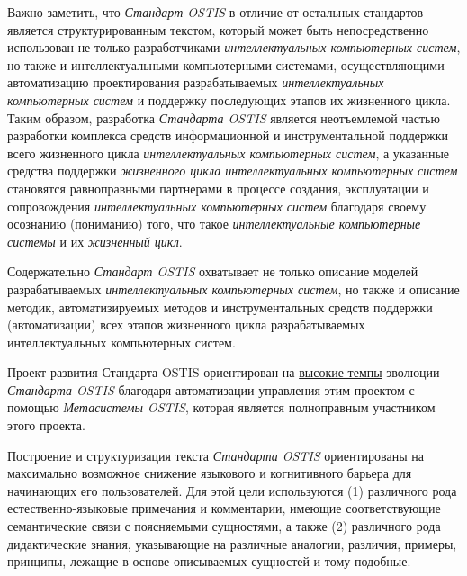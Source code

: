 Важно заметить, что \textit{Стандарт OSTIS} в отличие от остальных стандартов является структурированным  текстом, который может быть непосредственно использован не только разработчиками \textit{интеллектуальных компьютерных систем}, но также и интеллектуальными компьютерными системами, осуществляющими автоматизацию проектирования разрабатываемых \textit{интеллектуальных компьютерных систем} и поддержку последующих этапов их жизненного цикла. Таким образом, разработка \textit{Стандарта OSTIS} является неотъемлемой частью разработки комплекса средств информационной и инструментальной поддержки всего жизненного цикла \textit{интеллектуальных компьютерных систем}, а указанные средства поддержки \textit{жизненного цикла интеллектуальных компьютерных систем} становятся равноправными партнерами в процессе создания, эксплуатации и сопровождения \textit{интеллектуальных компьютерных систем} благодаря своему осознанию (пониманию) того, что такое \textit{интеллектуальные компьютерные системы} и их \textit{жизненный цикл}.

Содержательно \textit{Стандарт OSTIS} охватывает не только описание моделей разрабатываемых \textit{интеллектуальных компьютерных систем}, но также и описание методик, автоматизируемых методов и инструментальных средств поддержки (автоматизации) всех этапов жизненного цикла разрабатываемых интеллектуальных компьютерных систем.

Проект развития Стандарта OSTIS ориентирован на \uline{высокие темпы} эволюции \textit{Стандарта OSTIS} благодаря автоматизации управления этим проектом с помощью \textit{Метасистемы OSTIS}, которая является полноправным участником этого проекта.

Построение и структуризация текста \textit{Стандарта OSTIS} ориентированы на максимально возможное снижение языкового и когнитивного барьера для начинающих его пользователей. Для этой цели используются (1) различного рода естественно-языковые примечания и комментарии, имеющие соответствующие семантические связи с поясняемыми сущностями, а также (2) различного рода дидактические знания, указывающие на различные аналогии, различия, примеры, принципы, лежащие в основе описываемых сущностей и тому подобные.

